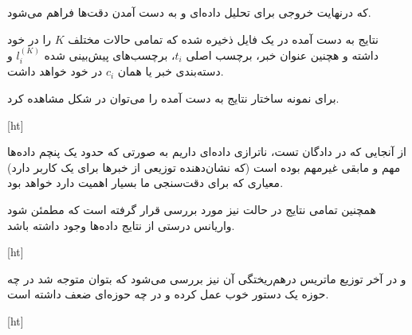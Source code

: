 که درنهایت خروجی برای تحلیل داده‌ای و به دست آمدن دقت‌ها فراهم می‌شود.


نتایج به دست آمده در یک فایل
ذخیره شده که تمامی حالات مختلف $K$  را در خود داشته و هچنین عنوان خبر، برچسب اصلی $t_i$، برچسب‌های پیش‌بینی شده $l_i^{(K)}$ و دسته‌بندی خبر یا همان $c_i$ در خود خواهد داشت.

برای نمونه ساختار نتایج به دست آمده را می‌توان در شکل  مشاهده کرد.


[ht]

از آنجایی که در دادگان تست، ناترازی داده‌ای داریم به صورتی که حدود یک پنچم داده‌ها مهم و مابقی غیرمهم بوده است (که نشان‌دهنده توزیعی از خبرها برای یک کاربر دارد) معیاری که برای دقت‌سنجی ما بسیار اهمیت دارد
خواهد بود.

همچنین تمامی نتایج در حالت
نیز مورد بررسی قرار گرفته است که مطمئن شود واریانس درستی از نتایج داده‌ها وجود داشته باشد.



[ht]

\pagebreak

و در آخر توزیع ماتریس درهم‌ریختگی آن نیز بررسی می‌شود که بتوان متوجه شد در چه حوزه‌ یک دستور خوب عمل کرده و در چه حوزه‌ای ضعف داشته است.



[ht]
